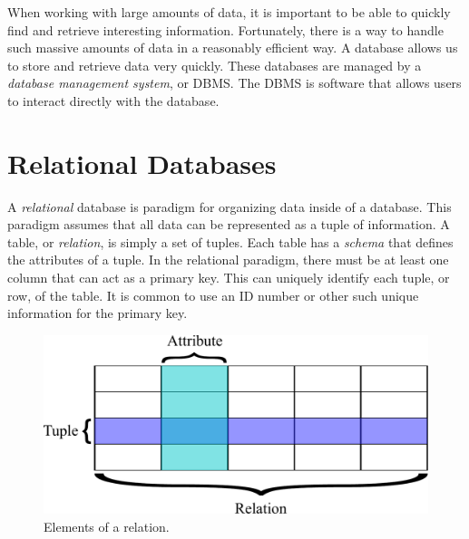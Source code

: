 \newcommand{\lsql}[1]{\lstinline[language=SQL,prebreak=]!#1!}

\label{lab:sql_rdb}

When working with large amounts of data, it is important to be able to quickly find and retrieve interesting information.
Fortunately, there is a way to handle such massive amounts of data in a reasonably efficient way.
A database allows us to store and retrieve data very quickly.
These databases are managed by a \emph{database management system}, or DBMS.
The DBMS is software that allows users to interact directly with the database.

\section*{Relational Databases}
A \emph{relational} database is paradigm for organizing data inside of a database.
This paradigm assumes that all data can be represented as a tuple of information.
A table, or \emph{relation}, is simply a set of tuples.
Each table has a \emph{schema} that defines the attributes of a tuple.
In the relational paradigm, there must be at least one column that can act as a primary key.
This can uniquely identify each tuple, or row, of the table.
It is common to use an ID number or other such unique information for the primary key.

\begin{figure}
\centering
\includegraphics[width=\textwidth]{rdb_table.pdf}
\caption{Elements of a relation.}
\label{fig:relation}
\end{figure}

